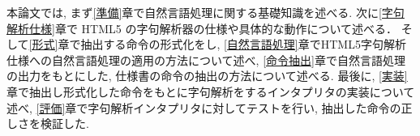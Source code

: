 \documentclass[uplatex,a4j]{jsreport}
\begin{document}
本論文では, まず\ref{準備}章で自然言語処理に関する基礎知識を述べる.
次に\ref{字句解析仕様}章で HTML5 の字句解析器の仕様や具体的な動作について述べる．
そして\ref{形式}章で抽出する命令の形式化をし, 
\ref{自然言語処理}章でHTML5字句解析仕様への自然言語処理の適用の方法について述べ, 
\ref{命令抽出}章で自然言語処理の出力をもとにした, 仕様書の命令の抽出の方法について述べる. 
最後に, \ref{実装}章で抽出し形式化した命令をもとに字句解析をするインタプリタの実装について述べ, 
\ref{評価}章で字句解析インタプリタに対してテストを行い, 抽出した命令の正しさを検証した.
\end{document}
